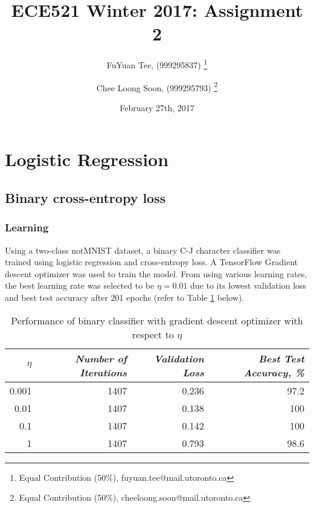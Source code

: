 \documentclass[a4paper,12pt]{article}
\title{ECE521 Winter 2017: Assignment 2}
\author{FuYuan Tee, (999295837)
  \thanks{Equal Contribution (50\%), fuyuan.tee@mail.utoronto.ca}
\and Chee Loong Soon, (999295793) \thanks{Equal Contribution (50\%),  cheeloong.soon@mail.utoronto.ca}}
\date{February 27th, 2017}
\begin{document}
\maketitle
\tableofcontents
\clearpage
\section{Logistic Regression}
\subsection{Binary cross-entropy loss}
\subsubsection{Learning}

Using a two-class notMNIST dataset, a binary C-J character classifier was trained using logistic regression and cross-entropy loss. A TensorFlow Gradient descent optimizer was used to train the model. From using various learning rates, the best learning rate was selected to be $\eta = 0.01$ due to its lowest validation loss and best test accuracy after 201 epochs (refer to Table \ref{table:TuneLearningRateSGD} below).

\begin{table}[!htb]
\centering
\caption{Performance of binary classifier with gradient descent optimizer with respect to $\eta$}
\label{table:TuneLearningRateSGD}
\vspace{0.5em}
\begin{tabular}{|r|r r r|} \hline
$\eta$ & \textit{Number of Iterations} & \textit{Validation Loss} & \textit{Best Test Accuracy, \%} \\ \hline
0.001 & 1407 & 0.236 & 97.2 \\
0.01 & 1407 & 0.138 & 100 \\
0.1 & 1407 & 0.142 & 100 \\
1 & 1407 & 0.793 & 98.6 \\
\hline
\end{tabular}
\end{table}

\end{document}
